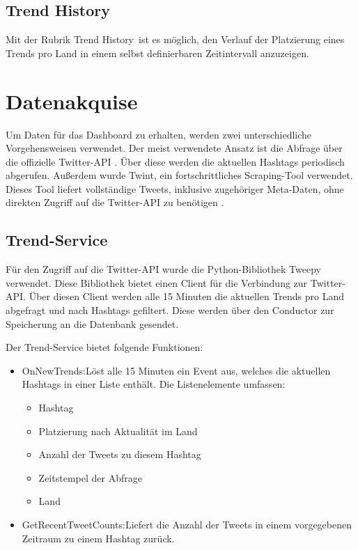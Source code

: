 \documentclass[conference]{IEEEtran}
\begin{document}
\subsection*{Trend History}
Mit der Rubrik \glqq Trend History\grqq\ ist es möglich, den Verlauf der Platzierung eines Trends pro Land in einem selbst definierbaren Zeitintervall anzuzeigen.

\section{Datenakquise}
Um Daten für das Dashboard zu erhalten, werden zwei unterschiedliche Vorgehensweisen verwendet.
Der meist verwendete Ansatz ist die Abfrage über die offizielle Twitter-API \cite{twitterapi}.
Über diese werden die aktuellen Hashtags periodisch abgerufen.
Außerdem wurde Twint, ein fortschrittliches Scraping-Tool verwendet.
Dieses Tool liefert vollständige Tweets, inklusive zugehöriger Meta-Daten,
ohne direkten Zugriff auf die Twitter-API zu benötigen \cite{twint}.

\subsection*{Trend-Service}
Für den Zugriff auf die Twitter-API wurde die Python-Bibliothek Tweepy \cite{tweepy} verwendet.
Diese Bibliothek bietet einen Client für die Verbindung zur Twitter-API.
Über diesen Client werden alle 15 Minuten die aktuellen Trends pro Land abgefragt und nach Hashtags gefiltert.
Diese werden über den Conductor zur Speicherung an die Datenbank gesendet.

Der Trend-Service bietet folgende Funktionen:
\begin{itemize}
    \item OnNewTrends:\newline Löst alle 15 Minuten ein Event aus, welches die aktuellen Hashtags in einer Liste enthält. Die Listenelemente umfassen:
          \begin{itemize}
              \item Hashtag
              \item Platzierung nach Aktualität im Land
              \item Anzahl der Tweets zu diesem Hashtag
              \item Zeitstempel der Abfrage
              \item Land
          \end{itemize}
    \item GetRecentTweetCounts:\newline Liefert die Anzahl der Tweets in einem vorgegebenen Zeitraum zu einem Hashtag zurück.

\end{itemize}
\end{document}
